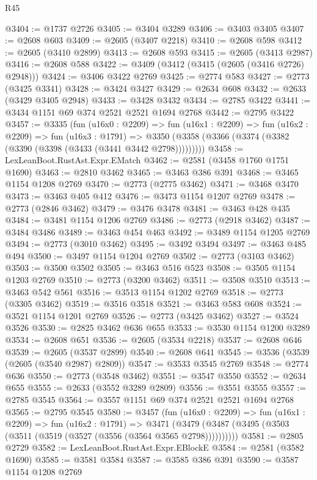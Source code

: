 \begin{lexlean}{R45}
\begin{coremodule}
@3404 := @1737 @2726
@3405 := @3404 @3289
@3406 := @3403 @3405
@3407 := @2608 @603
@3409 := @2605 (@3407 @2218)
@3410 := @2608 @598
@3412 := @2605 (@3410 @2899)
@3413 := @2608 @593
@3415 := @2605 (@3413 @2987)
@3416 := @2608 @588
@3422 := @3409 (@3412 (@3415 (@2605 (@3416 @2726) @2948)))
@3424 := @3406 @3422 @2769
@3425 := @2774 @583
@3427 := @2773 (@3425 @3341)
@3428 := @3424 @3427
@3429 := @2634 @608
@3432 := @2633 (@3429 @3405 @2948)
@3433 := @3428 @3432
@3434 := @2785 @3422
@3441 := @3434 @1151 @69 @374 @2521 @2521 @1694 @2768
@3442 := @2795 @3422
@3457 := @3335
    (fun (u16x0 : @2209) =>
    fun (u16x1 : @2209) =>
    fun (u16x2 : @2209) =>
    fun (u16x3 : @1791) =>
    @3350 (@3358 (@3366 (@3374 (@3382 (@3390 (@3398 (@3433 (@3441 @3442 @2798)))))))))
@3458 := LexLeanBoot.RustAst.Expr.EMatch
@3462 := @2581 (@3458 @1760 @1751 @1690)
@3463 := @2810 @3462
@3465 := @3463 @386 @391
@3468 := @3465 @1154 @1208 @2769
@3470 := @2773 (@2775 @3462)
@3471 := @3468 @3470
@3473 := @3463 @405 @412
@3476 := @3473 @1154 @1207 @2769
@3478 := @2773 (@2846 @3462)
@3479 := @3476 @3478
@3481 := @3463 @428 @435
@3484 := @3481 @1154 @1206 @2769
@3486 := @2773 (@2918 @3462)
@3487 := @3484 @3486
@3489 := @3463 @454 @463
@3492 := @3489 @1154 @1205 @2769
@3494 := @2773 (@3010 @3462)
@3495 := @3492 @3494
@3497 := @3463 @485 @494
@3500 := @3497 @1154 @1204 @2769
@3502 := @2773 (@3103 @3462)
@3503 := @3500 @3502
@3505 := @3463 @516 @523
@3508 := @3505 @1154 @1203 @2769
@3510 := @2773 (@3200 @3462)
@3511 := @3508 @3510
@3513 := @3463 @542 @561
@3516 := @3513 @1154 @1202 @2769
@3518 := @2773 (@3305 @3462)
@3519 := @3516 @3518
@3521 := @3463 @583 @608
@3524 := @3521 @1154 @1201 @2769
@3526 := @2773 (@3425 @3462)
@3527 := @3524 @3526
@3530 := @2825 @3462 @636 @655
@3533 := @3530 @1154 @1200 @3289
@3534 := @2608 @651
@3536 := @2605 (@3534 @2218)
@3537 := @2608 @646
@3539 := @2605 (@3537 @2899)
@3540 := @2608 @641
@3545 := @3536 (@3539 (@2605 (@3540 @2987) @2809))
@3547 := @3533 @3545 @2769
@3548 := @2774 @636
@3550 := @2773 (@3548 @3462)
@3551 := @3547 @3550
@3552 := @2634 @655
@3555 := @2633 (@3552 @3289 @2809)
@3556 := @3551 @3555
@3557 := @2785 @3545
@3564 := @3557 @1151 @69 @374 @2521 @2521 @1694 @2768
@3565 := @2795 @3545
@3580 := @3457
    (fun (u16x0 : @2209) =>
    fun (u16x1 : @2209) =>
    fun (u16x2 : @1791) =>
    @3471 (@3479 (@3487 (@3495 (@3503 (@3511 (@3519 (@3527 (@3556 (@3564 @3565 @2798))))))))))
@3581 := @2805 @2729
@3582 := LexLeanBoot.RustAst.Expr.EBlockE
@3584 := @2581 (@3582 @1690)
@3585 := @3581 @3584
@3587 := @3585 @386 @391
@3590 := @3587 @1154 @1208 @2769

\end{coremodule}
\end{lexlean}
